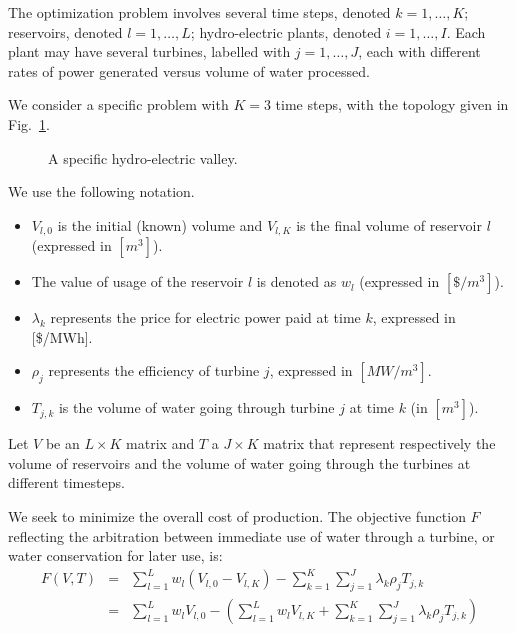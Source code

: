 \documentclass[11pt]{article}
\begin{document}
The optimization problem involves several time steps, denoted $k=1,\ldots,K$; reservoirs, denoted  $l = 1, \ldots, L$; hydro-electric plants, denoted $i = 1, \ldots, I$. Each plant may have several turbines, labelled with $j=1,\ldots,J$, each with different rates of power generated versus volume of water processed.

We consider a specific problem with $K = 3$ time steps, with the topology given in Fig.~\ref{fig:lpqp_hydro_valley}.
\begin{figure}[ht]
\begin{center}
\caption{\label{fig:lpqp_hydro_valley} A specific hydro-electric valley.}
\end{center}
\end{figure}

We use the following notation.
\begin{itemize}
\item $V_{l,0}$ is the initial (known) volume and $V_{l,K}$ is the final volume of reservoir $l$ (expressed in $[m^3]$).
\item The value of usage of the reservoir $l$ is denoted as $w_l$ (expressed in $[\$/m^3]$).
\item $\lambda_k$ represents the price for electric power paid at time $k$, expressed in [\$/MWh].
\item $\rho_j$ represents the efficiency of turbine $j$, expressed in $[MW/m^3]$.
\item $T_{j,k}$ is the volume of water going through turbine $j$ at time $k$ (in $[m^3]$).
\end{itemize}
Let $V$ be an $L \times K$ matrix and $T$ a $J \times K$ matrix that represent respectively the volume of reservoirs and the volume of water going through the turbines at different timesteps.

We seek to minimize the overall cost of production. The objective function $F$ reflecting the arbitration between immediate use of water through a turbine, or water conservation for later use, is:
\begin{align*}
F(V,T) &=& \sum_{l=1}^{L} w_l(V_{l,0} - V_{l,K}) - \sum_{k=1}^{K}\sum_{j=1}^{J} \lambda_k \rho_{j}T_{j,k}
\\
&=&  \sum_{l=1}^{L} w_lV_{l,0}  - \left( \sum_{l=1}^{L} w_lV_{l,K} + \sum_{k=1}^{K}\sum_{j=1}^{J} \lambda_k \rho_{j}T_{j,k}\right)
\end{align*}
\end{document}
